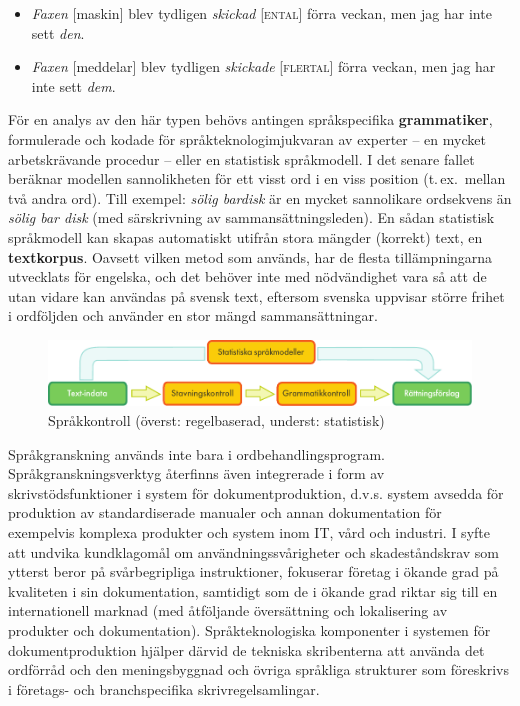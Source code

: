 \begin{multicols}{2}
\begin{itemize}
\item \textit{Faxen} [maskin] blev tydligen \textit{skickad} [\textsc{ental}] förra veckan, men jag har inte sett \textit{den}.
\item \textit{Faxen} [meddelar] blev tydligen \textit{skickade} [\textsc{flertal}] förra veckan, men jag har inte sett \textit{dem}.
\end{itemize}

För en analys av den här typen behövs antingen språkspecifika
\textbf{grammatiker}, formulerade och kodade för
språkteknologimjukvaran av experter -- en mycket arbetskrävande
procedur -- eller en statistisk språkmodell. I det senare fallet
beräknar modellen sannolikheten för ett visst ord i en viss position
(t.\,ex.~mellan två andra ord). Till exempel: \textit{sölig bardisk} är
en mycket sannolikare ordsekvens än \textit{sölig bar disk} (med
särskrivning av sammansättningsleden). En sådan statistisk språkmodell
kan skapas automatiskt utifrån stora mängder (korrekt) text, en
\textbf{textkorpus}. Oavsett vilken metod som används, har de flesta
tillämpningarna utvecklats för engelska, och det behöver inte med
nödvändighet vara så att de utan vidare kan användas på svensk text,
eftersom svenska uppvisar större frihet i ordföljden och använder en
stor mängd sammansättningar.



\begin{figure}[htb]
  \center
  \includegraphics[width=\textwidth]{../_media/swedish/language_checking}
  \caption{Språkkontroll (överst: regelbaserad, underst: statistisk)}
  \label{fig:langcheckingaarch_sv}
\end{figure}

Språkgranskning används inte bara i
ordbehandlingsprogram. Språkgranskningsverktyg återfinns även
integrerade i form av skrivstödsfunktioner i system för
dokumentproduktion, d.v.s. system avsedda för produktion av
standardiserade manualer och annan dokumentation för exempelvis
komplexa produkter och system inom IT, vård och industri. I syfte att
undvika kundklagomål om användningssvårigheter och skadeståndskrav som
ytterst beror på svårbegripliga instruktioner, fokuserar företag i
ökande grad på kvaliteten i sin dokumentation, samtidigt som de i
ökande grad riktar sig till en internationell marknad (med åtföljande
översättning och lokalisering av produkter och
dokumentation). Språkteknologiska komponenter i systemen för
dokumentproduktion hjälper därvid de tekniska skribenterna att använda
det ordförråd och den meningsbyggnad och övriga språkliga strukturer
som föreskrivs i företags- och branchspecifika skrivregelsamlingar.


\end{multicols}

